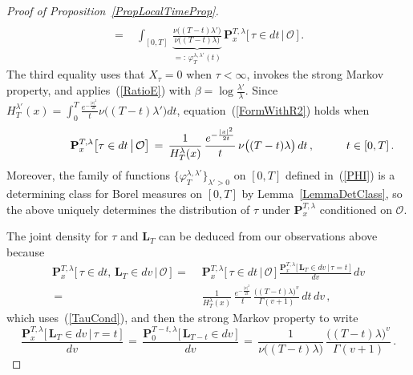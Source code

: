 \documentclass[10pt]{article}
\numberwithin{equation}{section}
\theoremstyle{definition}
\begin{document}
\begin{proof}[Proof of Proposition~\ref{PropLocalTimeProp}]
\begin{align}
  \\ \,=\,&\,\int_{[0,T] }\, \underbrace{\frac{\nu\big((T-t)\lambda' \big)  }{ \nu\big((T-t)\lambda\big)  }}_{ =:\,\varphi_{T}^{\lambda,\lambda'}(t)   }\,\mathbf{P}_{x }^{T,\lambda}\big[\,\tau \in dt\,\big|\,\mathcal{O}\,\big] \,.
\end{align}
The third equality uses that $X_{\tau}=0$ when $\tau<\infty$, invokes the strong Markov property, and applies~(\ref{RatioE}) with $\beta=\log\frac{\lambda'}{\lambda} $.  Since $H^{\lambda'}_T(x)=\int_0^T \frac{ e^{-\frac{|x|^2  }{2t} } }{ t } \nu\big((T-t)\lambda'\big) dt $, equation~(\ref{FormWithR2}) holds when 
\begin{align}\label{TauCond}
\text{} \hspace{1.5cm}\mathbf{P}_{x }^{T,\lambda}\big[\tau \in dt\,\big|\,\mathcal{O}\big]\,=\,\frac{ 1 }{ H^{\lambda}_T(x)   } \,\frac{ e^{-\frac{|x|^2  }{2t} } }{ t } \,\nu\big((T-t)\lambda\big)\,dt\,,   \hspace{1cm}t\in [0,T]\,. 
\end{align}
Moreover,  the family of  functions $\{ \varphi_{T}^{\lambda,\lambda'} \}_{\lambda'>0}$ on $[0,T]$  defined in~(\ref{PHI})  is a determining class for Borel measures on $[0,T]$ by Lemma~\ref{LemmaDetClass}, so the above uniquely determines  the distribution of $\tau$ under $\mathbf{P}_{x }^{T,\lambda}$ conditioned on $\mathcal{O}$.  

The joint density for $\tau$ and  $\mathbf{L}_T$ can  be deduced from our observations above because 
\begin{align*} \mathbf{P}_{x }^{T,\lambda}\big[\,\tau \in dt, \,\mathbf{L}_T\in dv\,\big|\,\mathcal{O}\,\big] \,=\,&\,\mathbf{P}_{x }^{T,\lambda}\big[\,\tau \in dt\,\big|\,\mathcal{O}\,\big] \, \frac{\mathbf{P}_{x }^{T,\lambda}\big[\,\mathbf{L}_T\in dv\,\big|\,\tau=t\,\big] }{dv}\,dv
\\
\,=\,&\,\frac{ 1 }{ H^{\lambda}_T(x)   }\, \frac{ e^{-\frac{|x|^2  }{2t} } }{ t } \,\frac{ \big((T-t)\lambda \big)^v  }{\Gamma(v+1)  }\,dt\,dv\,,
\end{align*}
which uses~(\ref{TauCond}), and then the strong Markov property to write
$$ \frac{\mathbf{P}_{x }^{T,\lambda}\big[\,\mathbf{L}_T\in dv\,\big|\,\tau=t\,\big] }{dv}\,=\, \frac{\mathbf{P}_{0 }^{T-t,\lambda}\big[\,\mathbf{L}_{T-t}\in dv\,\big] }{dv}\,=\, \frac{1}{\nu\big((T-t)\lambda\big)}  \, \frac{ \big((T-t)\lambda \big)^v  }{\Gamma(v+1)  }\,. $$




\end{proof}
\end{document}
